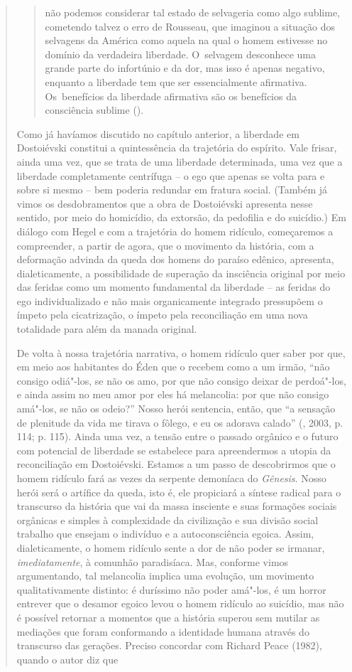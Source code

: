 {\begin{quote}
\begin{quote}
não podemos considerar tal estado de selvageria como algo sublime,
cometendo talvez o erro de Rousseau, que imaginou a situação dos
selvagens da América como aquela na qual o homem estivesse no domínio da
verdadeira liberdade. O~selvagem desconhece uma grande parte do
infortúnio e da dor, mas isso é apenas negativo, enquanto a liberdade
tem que ser essencialmente afirmativa. Os~benefícios da liberdade
afirmativa são os benefícios da consciência sublime ().
\end{quote}

Como já havíamos discutido no capítulo anterior, a liberdade em
Dostoiévski constitui a quintessência da trajetória do espírito. Vale
frisar, ainda uma vez, que se trata de uma liberdade determinada, uma
vez que a liberdade completamente centrífuga -- o ego que apenas se
volta para e sobre si mesmo -- bem poderia redundar em fratura social.
(Também já vimos os desdobramentos que a obra de Dostoiévski apresenta
nesse sentido, por meio do homicídio, da extorsão, da pedofilia e do
suicídio.) Em diálogo com Hegel e com a trajetória do homem ridículo,
começaremos a compreender, a partir de agora, que o movimento da
história, com a deformação advinda da queda dos homens do paraíso
edênico, apresenta, dialeticamente, a possibilidade de superação da
insciência original por meio das feridas como um momento fundamental da
liberdade -- as feridas do ego individualizado e não mais organicamente
integrado pressupõem o ímpeto pela cicatrização, o ímpeto pela
reconciliação em uma nova totalidade para além da manada original.

De volta à nossa trajetória narrativa, o homem ridículo quer saber por
que, em meio aos habitantes do Éden que o recebem como a um irmão, ``não
consigo odiá"-los, se não os amo, por que não consigo deixar de
perdoá"-los, e ainda assim no meu amor por eles há melancolia: por que
não consigo amá"-los, se não os odeio?'' Nosso herói sentencia, então,
que ``a sensação de plenitude da vida me tirava o fôlego, e eu os
adorava calado'' (, 2003, p. 114; p. 115). Ainda uma vez, a
tensão entre o passado orgânico e o futuro com potencial de liberdade se
estabelece para apreendermos a utopia da reconciliação em Dostoiévski.
Estamos a um passo de descobrirmos que o homem ridículo fará as vezes da
serpente demoníaca do \emph{Gênesis}. Nosso herói será o artífice da
queda, isto é, ele propiciará a síntese radical para o transcurso da
história que vai da massa insciente e suas formações sociais orgânicas e
simples à complexidade da civilização e sua divisão social trabalho que
ensejam o indivíduo e a autoconsciência egoica. Assim, dialeticamente, o
homem ridículo sente a dor de não poder se irmanar,
\emph{imediatamente}, à comunhão paradisíaca. Mas, conforme vimos
argumentando, tal melancolia implica uma evolução, um movimento
qualitativamente distinto: é duríssimo não poder amá"-los, é um horror
entrever que o desamor egoico levou o homem ridículo ao suicídio, mas
não é possível retornar a momentos que a história superou sem mutilar as
mediações que foram conformando a identidade humana através do
transcurso das gerações. Preciso concordar com Richard Peace (1982),
quando o autor diz que


\end{quote}}
